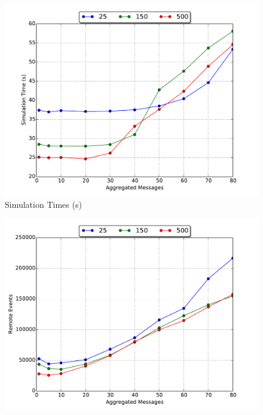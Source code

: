 \documentclass[11pt]{book}
\begin{document}
\begin{figure}
  \centering
  \begin{minipage}{.5\textwidth}
    \begin{center}
      \includegraphics[width=\textwidth,keepaspectratio,quiet]{figs/partitioning_communication/aggregate_epidemic_time.pdf} \\
      Simulation Times (s) \\
    \end{center}
  \end{minipage}
  \begin{minipage}{.5\textwidth}
    \begin{center}
      \includegraphics[width=\textwidth,keepaspectratio,quiet]{figs/partitioning_communication/aggregate_epidemic_remote.pdf} \\

\end{center}
\end{minipage}
\end{figure}
\end{document}
